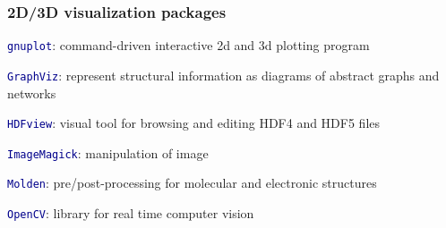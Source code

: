 \begin{frame}
\frametitle{2D/3D visualization packages}

\begin{small}
\vspace{-2mm}
\textcolor{DarkRed}{} \textcolor{DarkBlue}{\tt gnuplot}: %
        command-driven interactive 2d and 3d plotting program

\vspace{1.15mm}
\textcolor{DarkRed}{} \textcolor{DarkBlue}{\tt GraphViz}: %
        represent structural information as diagrams of abstract graphs and networks

\vspace{1.15mm}
\textcolor{DarkRed}{} \textcolor{DarkBlue}{\tt HDFview}: %
        visual tool for browsing and editing HDF4 and HDF5 files

\vspace{1.15mm}
\textcolor{DarkRed}{} \textcolor{DarkBlue}{\tt ImageMagick}: %
        manipulation of image

\vspace{1.15mm}
\textcolor{DarkRed}{} \textcolor{DarkBlue}{\tt Molden}: %
        pre/post-processing for molecular and electronic structures

\vspace{1.15mm}
\textcolor{DarkRed}{} \textcolor{DarkBlue}{\tt OpenCV}: %
        library for real time computer vision


\end{small}
\end{frame}

